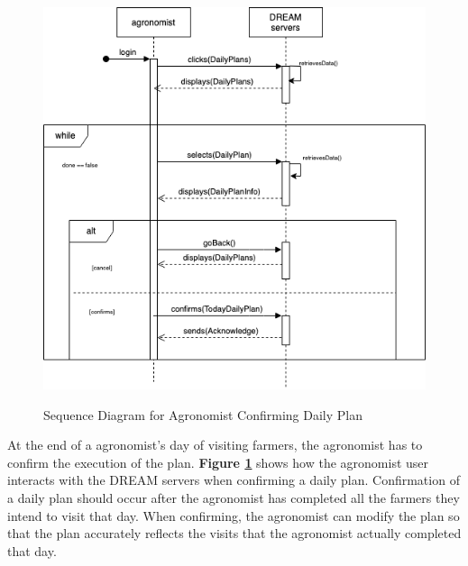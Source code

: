 \begin{figure}[hpt!]
\centering
\includegraphics[scale=0.45]{Files/sequence_disgrams/thePNGs/agronomist_confirmPlan.png}\\
\caption{\label{fig:agrSeqConfirmPlan}Sequence Diagram for Agronomist Confirming Daily Plan}
\end{figure}

\pagebreak
\begin{flushleft}
At the end of a agronomist's day of visiting farmers, the agronomist has to confirm the execution of the plan. \textbf{Figure \ref{fig:agrSeqConfirmPlan}} shows how the agronomist user interacts with the DREAM servers when confirming a daily plan. Confirmation of a daily plan should occur after the agronomist has completed all the farmers they intend to visit that day. When confirming, the agronomist can modify the plan so that the plan accurately reflects the visits that the agronomist actually completed that day.
\end{flushleft}


